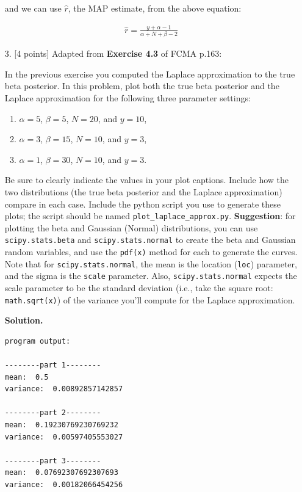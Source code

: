 \documentclass[10pt]{article}
\begin{document}
\begin{itemize}
and we can use $\hat{r}$, the MAP estimate, from the above equation:

\begin{align*}
    \hat{r} = 
    \frac{y + \alpha - 1}{\alpha + N + \beta - 2}
\end{align*}

\item[3.]  [4 points]
Adapted from {\bf Exercise 4.3} of FCMA p.163:

In the previous exercise you computed the Laplace approximation to the true beta posterior.  In this problem, plot both the true beta posterior and the Laplace approximation for the following three parameter settings:
\begin{enumerate}
\item $\alpha = 5$, $\beta = 5$, $N = 20$, and $y = 10$,
\item $\alpha = 3$, $\beta = 15$, $N = 10$, and $y = 3$,
\item $\alpha = 1$, $\beta = 30$, $N = 10$, and $y = 3$.
\end{enumerate}
Be sure to clearly indicate the values in your plot captions.  Include how the two distributions (the true beta posterior and the Laplace approximation) compare in each case.  Include the python script you use to generate these plots; the script should be named {\tt plot\_laplace\_approx.py}.  {\bf Suggestion}: for plotting the beta and Gaussian (Normal) distributions, you can use {\tt scipy.stats.beta} and {\tt scipy.stats.normal} to create the beta and Gaussian random variables, and use the {\tt pdf(x)} method for each to generate the curves.  Note that for {\tt scipy.stats.normal}, the mean is the location ({\tt loc}) parameter, and the sigma is the {\tt scale} parameter.  Also, {\tt scipy.stats.normal} expects the scale parameter to be the standard deviation (i.e., take the square root: {\tt math.sqrt(x)}) of the variance you'll compute for the Laplace approximation.


{\bf Solution.}

\begin{verbatim}
program output:

--------part 1--------
mean:  0.5
variance:  0.00892857142857

--------part 2--------
mean:  0.19230769230769232
variance:  0.00597405553027

--------part 3--------
mean:  0.07692307692307693
variance:  0.00182066454256

\end{verbatim}


\end{itemize}
\end{document}
